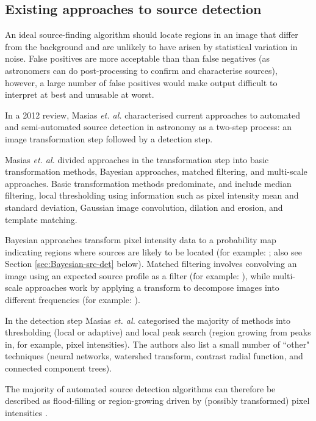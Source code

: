 \subsection{Existing approaches to source detection}

An ideal source-finding algorithm should locate regions in an image that differ from the background and are unlikely to have arisen by statistical variation in noise. False positives are more acceptable than than false negatives (as astronomers can do post-processing to confirm and characterise sources), however, a large number of false positives would make output difficult to interpret at best and unusable at worst.

In a 2012 review, Masias \emph{et. al.} \cite{masias2012review} characterised current approaches to automated and semi-automated source detection in astronomy as a two-step process: an image transformation step followed by a detection step. 

Masias \emph{et. al.} divided approaches in the transformation step into basic transformation methods, Bayesian approaches, matched filtering, and multi-scale approaches. Basic transformation methods predominate, and include median filtering, local thresholding using information such as pixel intensity mean and standard deviation, Gaussian image convolution, dilation and erosion, and template matching.

Bayesian approaches transform pixel intensity data to a probability map indicating regions where sources are likely to be located (for example: \cite{feroz2008multimodal}; also see Section \ref{sec:Bayesian-src-det} below). Matched filtering involves convolving an image using an expected source profile as a filter (for example: \cite{torrent2010detecting}), while multi-scale approaches work by applying a transform to decompose images into different frequencies (for example: \cite{peracaula2011segmentation}). 

In the detection step Masias \emph{et. al.} categorised the majority of methods into thresholding (local or adaptive) and local peak search (region growing from peaks in, for example, pixel intensities). The authors also list a small number of ``other" techniques (neural networks, watershed transform, contrast radial function, and connected component trees).

The majority of automated source detection algorithms can therefore be described as flood-filling or region-growing driven by (possibly transformed) pixel intensities \cite{masias2012review}.

